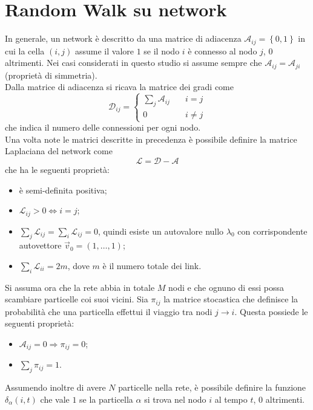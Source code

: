 \documentclass[../main.tex]{subfiles}
\begin{document}
\section{Random Walk su network}
In generale, un network è descritto da una matrice di adiacenza $\mathcal{A}_{ij}=\left\{0,1\right\}$ in cui la cella $(i,j)$ assume il valore $1$ se il nodo $i$ è connesso al nodo $j$, $0$ altrimenti.
Nei casi considerati in questo studio si assume sempre che $\mathcal{A}_{ij}=\mathcal{A}_{ji}$ (proprietà di simmetria).
\\Dalla matrice di adiacenza si ricava la matrice dei gradi come
\begin{equation*}
    \mathcal{D}_{ij}=
    \begin{cases}
        \sum_j\mathcal{A}_{ij} \quad &i=j\\
        0 &i\neq j
    \end{cases}
\end{equation*}
che indica il numero delle connessioni per ogni nodo.
\\Una volta note le matrici descritte in precedenza è possibile definire la matrice Laplaciana del network come
\begin{equation}
    \mathcal{L}=\mathcal{D}-\mathcal{A} 
\end{equation}
che ha le seguenti proprietà:
\begin{itemize}
    \item è semi-definita positiva;
    \item $\mathcal{L}_{ij}>0\Longleftrightarrow i=j$;
    \item $\sum_j\mathcal{L}_{ij}=\sum_i\mathcal{L}_{ij}=0$, quindi esiste un autovalore nullo $\lambda_0$ con corrispondente autovettore $\vec{v}_0=(1,\ldots,1)$;
    \item $\sum_i\mathcal{L}_{ii}=2m$, dove $m$ è il numero totale dei link.
\end{itemize}
Si assuma ora che la rete abbia in totale $M$ nodi e che ognuno di essi possa scambiare particelle coi suoi vicini.
Sia $\pi_{ij}$ la matrice stocastica che definisce la probabilità che una particella effettui il viaggio tra nodi $j\to i$.
Questa possiede le seguenti proprietà:
\begin{itemize}
    \item $\mathcal{A}_{ij}=0 \Longrightarrow \pi_{ij}=0$;
    \item $\sum_j\pi_{ij}=1$.
\end{itemize}
Assumendo inoltre di avere $N$ particelle nella rete, è possibile definire la funzione $\delta_\alpha(i,t)$ che vale $1$ se la particella $\alpha$ si trova nel nodo $i$ al tempo $t$, 0 altrimenti.
\end{document}
